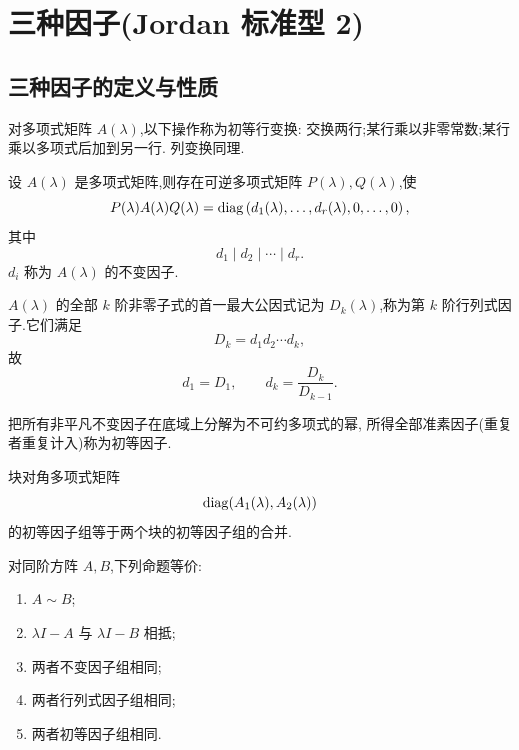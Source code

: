 \newpage

\section{三种因子(Jordan 标准型 2)}

\subsection{三种因子的定义与性质}

\begin{definition}
对多项式矩阵 $A(\lambda)$,以下操作称为初等行变换:
交换两行;某行乘以非零常数;某行乘以多项式后加到另一行.
列变换同理.
\end{definition}

\begin{theorem}
设 $A(\lambda)$ 是多项式矩阵,则存在可逆多项式矩阵
$P(\lambda),Q(\lambda)$,使
\[
P(\lambda)A(\lambda)Q(\lambda)
=
\operatorname{diag}\left(d_1(\lambda),\ldots,d_r(\lambda),0,\ldots,0\right),
\]
其中
\[
d_1\mid d_2\mid\cdots\mid d_r.
\]
$d_i$ 称为 $A(\lambda)$ 的不变因子.
\end{theorem}

\begin{definition}
$A(\lambda)$ 的全部 $k$ 阶非零子式的首一最大公因式记为
$D_k(\lambda)$,称为第 $k$ 阶行列式因子.它们满足
\[
D_k=d_1d_2\cdots d_k,
\]
故
\[
d_1=D_1,\qquad
d_k=\dfrac{D_k}{D_{k-1}}.
\]
\end{definition}

\begin{definition}
把所有非平凡不变因子在底域上分解为不可约多项式的幂,
所得全部准素因子(重复者重复计入)称为初等因子.
\end{definition}

\begin{proposition}[\markstar]
块对角多项式矩阵
\[
\operatorname{diag}(A_1(\lambda),A_2(\lambda))
\]
的初等因子组等于两个块的初等因子组的合并.
\end{proposition}

\begin{theorem}[\marktwostar]
对同阶方阵 $A,B$,下列命题等价:
\begin{enumerate}
    \item $A\sim B$;
    \item $\lambda I-A$ 与 $\lambda I-B$ 相抵;
    \item 两者不变因子组相同;
    \item 两者行列式因子组相同;
    \item 两者初等因子组相同.
\end{enumerate}
\end{theorem}

